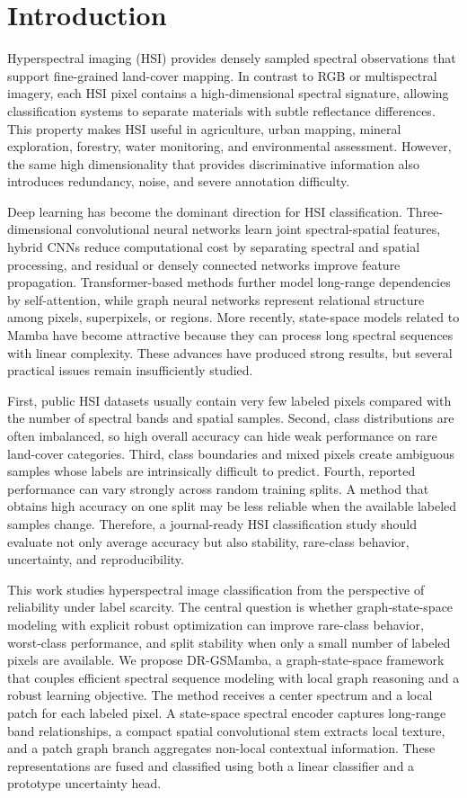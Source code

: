 \section{Introduction}
Hyperspectral imaging (HSI) provides densely sampled spectral observations that support fine-grained land-cover mapping. In contrast to RGB or multispectral imagery, each HSI pixel contains a high-dimensional spectral signature, allowing classification systems to separate materials with subtle reflectance differences. This property makes HSI useful in agriculture, urban mapping, mineral exploration, forestry, water monitoring, and environmental assessment. However, the same high dimensionality that provides discriminative information also introduces redundancy, noise, and severe annotation difficulty.

Deep learning has become the dominant direction for HSI classification. Three-dimensional convolutional neural networks learn joint spectral-spatial features, hybrid CNNs reduce computational cost by separating spectral and spatial processing, and residual or densely connected networks improve feature propagation. Transformer-based methods further model long-range dependencies by self-attention, while graph neural networks represent relational structure among pixels, superpixels, or regions. More recently, state-space models related to Mamba have become attractive because they can process long spectral sequences with linear complexity. These advances have produced strong results, but several practical issues remain insufficiently studied.

First, public HSI datasets usually contain very few labeled pixels compared with the number of spectral bands and spatial samples. Second, class distributions are often imbalanced, so high overall accuracy can hide weak performance on rare land-cover categories. Third, class boundaries and mixed pixels create ambiguous samples whose labels are intrinsically difficult to predict. Fourth, reported performance can vary strongly across random training splits. A method that obtains high accuracy on one split may be less reliable when the available labeled samples change. Therefore, a journal-ready HSI classification study should evaluate not only average accuracy but also stability, rare-class behavior, uncertainty, and reproducibility.

This work studies hyperspectral image classification from the perspective of reliability under label scarcity. The central question is whether graph-state-space modeling with explicit robust optimization can improve rare-class behavior, worst-class performance, and split stability when only a small number of labeled pixels are available. We propose DR-GSMamba, a graph-state-space framework that couples efficient spectral sequence modeling with local graph reasoning and a robust learning objective. The method receives a center spectrum and a local patch for each labeled pixel. A state-space spectral encoder captures long-range band relationships, a compact spatial convolutional stem extracts local texture, and a patch graph branch aggregates non-local contextual information. These representations are fused and classified using both a linear classifier and a prototype uncertainty head.

